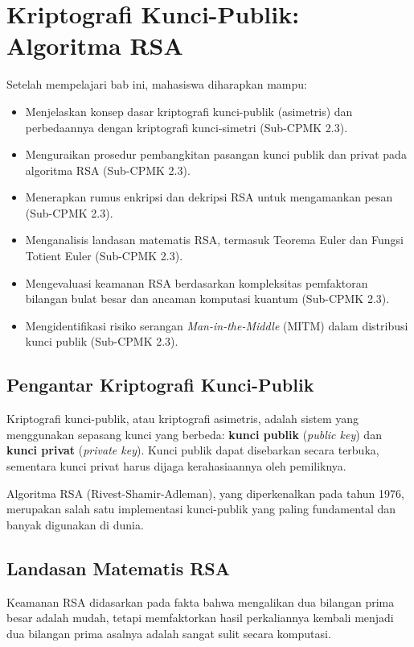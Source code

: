 \documentclass[../main.tex]{subfiles}
\begin{document}
\chapter{Kriptografi Kunci-Publik: Algoritma RSA}

\begin{learningoutcome}
Setelah mempelajari bab ini, mahasiswa diharapkan mampu:
\begin{itemize}
    \item Menjelaskan konsep dasar kriptografi kunci-publik (asimetris) dan perbedaannya dengan kriptografi kunci-simetri (Sub-CPMK 2.3).
    \item Menguraikan prosedur pembangkitan pasangan kunci publik dan privat pada algoritma RSA (Sub-CPMK 2.3).
    \item Menerapkan rumus enkripsi dan dekripsi RSA untuk mengamankan pesan (Sub-CPMK 2.3).
    \item Menganalisis landasan matematis RSA, termasuk Teorema Euler dan Fungsi Totient Euler (Sub-CPMK 2.3).
    \item Mengevaluasi keamanan RSA berdasarkan kompleksitas pemfaktoran bilangan bulat besar dan ancaman komputasi kuantum (Sub-CPMK 2.3).
    \item Mengidentifikasi risiko serangan \textit{Man-in-the-Middle} (MITM) dalam distribusi kunci publik (Sub-CPMK 2.3).
\end{itemize}
\end{learningoutcome}

\section{Pengantar Kriptografi Kunci-Publik}
Kriptografi kunci-publik, atau kriptografi asimetris, adalah sistem yang menggunakan sepasang kunci yang berbeda: \textbf{kunci publik} (\textit{public key}) dan \textbf{kunci privat} (\textit{private key}). Kunci publik dapat disebarkan secara terbuka, sementara kunci privat harus dijaga kerahasiaannya oleh pemiliknya.

Algoritma RSA (Rivest-Shamir-Adleman), yang diperkenalkan pada tahun 1976, merupakan salah satu implementasi kunci-publik yang paling fundamental dan banyak digunakan di dunia.

\section{Landasan Matematis RSA}
Keamanan RSA didasarkan pada fakta bahwa mengalikan dua bilangan prima besar adalah mudah, tetapi memfaktorkan hasil perkaliannya kembali menjadi dua bilangan prima asalnya adalah sangat sulit secara komputasi.
\end{document}
